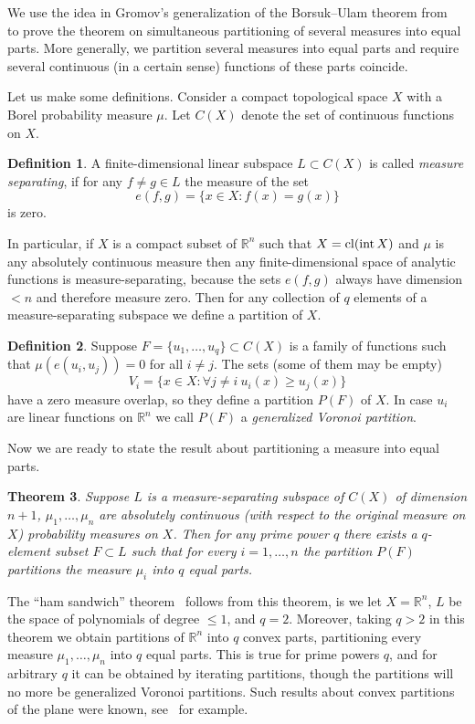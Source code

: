 \documentclass[12pt,a4paper,oneside]{amsart}
\newtheorem{thm}{Theorem}[section]
\theoremstyle{definition}
\newtheorem{defn}[thm]{Definition}
\theoremstyle{remark}
\numberwithin{equation}{section}
\newcommand{\inte}{\mathop{\rm int}}
\begin{document}
We use the idea in Gromov's generalization of the Borsuk--Ulam theorem from~\cite{gr2003,mem2009} to prove the theorem on simultaneous partitioning of several measures into equal parts. More generally, we partition several measures into equal parts and require several continuous (in a certain sense) functions of these parts coincide.

Let us make some definitions. Consider a compact topological space $X$ with a Borel probability measure $\mu$. Let $C(X)$ denote the set of continuous functions on $X$.

\begin{defn}
A finite-dimensional linear subspace $L\subset C(X)$ is called \emph{measure separating}, if for any $f\neq g\in L$ the measure of the set 
$$
e(f, g) = \{x\in X : f(x) = g(x)\}
$$
is zero.
\end{defn}

In particular, if $X$ is a compact subset of $\mathbb R^n$ such that $X=\cl(\inte X)$ and $\mu$ is any absolutely continuous measure then any finite-dimensional space of analytic functions is measure-separating, because the sets $e(f,g)$ always have dimension $<n$ and therefore measure zero. Then for any collection of $q$ elements of a measure-separating subspace we define a partition of $X$.

\begin{defn}
Suppose $F=\{u_1, \ldots, u_q\} \subset C(X)$ is a family of functions such that $\mu (e(u_i,u_j)) = 0$ for all $i\neq j$. The sets (some of them may be empty)
$$
V_i = \{x\in X : \forall j\neq i\ u_i(x)\ge u_j(x)\}
$$
have a zero measure overlap, so they define a partition $P(F)$ of $X$. In case $u_i$ are linear functions on $\mathbb R^n$ we call $P(F)$ a \emph{generalized Voronoi partition}.
\end{defn}

Now we are ready to state the result about partitioning a measure into equal parts.

\begin{thm}
\label{gen-spl}
Suppose $L$ is a measure-separating subspace of $C(X)$ of dimension $n+1$, $\mu_1,\ldots, \mu_n$ are absolutely continuous (with respect to the original measure on $X$) probability measures on $X$. Then for any prime power $q$ there exists a $q$-element subset $F\subset L$ such that for every $i=1,\ldots,n$ the partition $P(F)$ partitions the measure $\mu_i$ into $q$ equal parts.
\end{thm}

The ``ham sandwich'' theorem~\cite{st1942,ste1945} follows from this theorem, is we let $X=\mathbb R^n$, $L$ be the space of polynomials of degree $\le 1$, and $q=2$. Moreover, taking $q>2$ in this theorem we obtain partitions of $\mathbb R^n$ into $q$ convex parts, partitioning every measure $\mu_1, \ldots, \mu_n$ into $q$ equal parts. This is true for prime powers $q$, and for arbitrary $q$ it can be obtained by iterating partitions, though the partitions will no more be generalized Voronoi partitions. Such results about convex partitions of the plane were known, see~\cite{kbs2000} for example.
\end{document}
